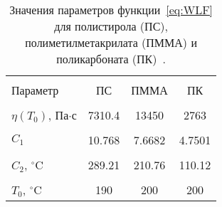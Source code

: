 \begin{table}[h]
	\vspace{1em}
	\centering
	\caption{Значения параметров функции~\ref{eq:WLF} для полистирола (ПС), полиметилметакрилата (ПММА) и поликарбоната (ПК)~\cite{aho2008measurement_WLF}.}
	\begin{tabular}{l c c c}
		\hline \hline \\ [-1em]
		Параметр \hspace{2em} & ПС \hspace{2em} & ПММА \hspace{2em} & ПК
		\\ \hline \\ [-1em]
		$\eta(T_0)$, Па$\cdot$с \hspace{2em} & 7310.4 \hspace{2em} & 13450 \hspace{2em} & 2763
		\\ \\ [-1em]
		$C_1$ \hspace{2em} & 10.768 \hspace{2em} & 7.6682 \hspace{2em} & 4.7501
		\\ \\ [-1em]
		$C_2$, $^\circ$C \hspace{2em} & 289.21 \hspace{2em} & 210.76 \hspace{2em} & 110.12
		\\ \\ [-1em]
		$T_0$, $^\circ$C \hspace{2em} & 190 \hspace{2em} & 200 \hspace{2em} & 200
		\\ \hline \hline
	\end{tabular}
\label{table:WLF}
\end{table}


